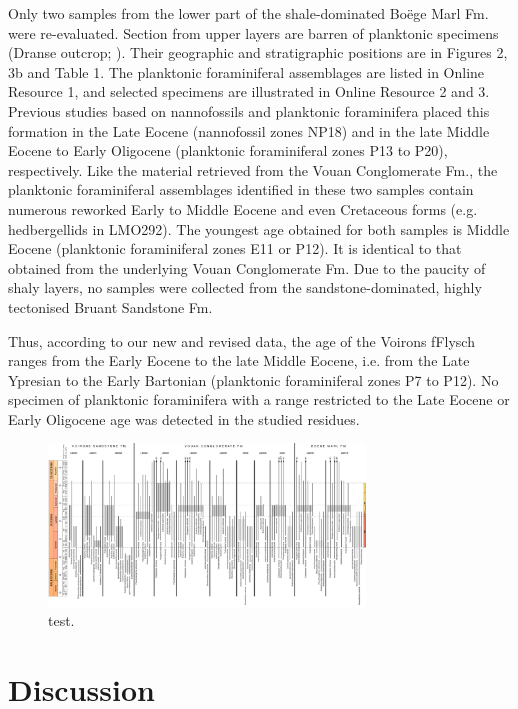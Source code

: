 \documentclass[twoside]{article}
\begin{document}
Only two samples from the lower part of the shale-dominated Boëge Marl Fm. were re-evaluated. Section from upper layers are barren of planktonic specimens (Dranse outcrop; \citealp{JanduChene1975c}). Their geographic and stratigraphic positions are  in Figures 2, 3b and Table 1. The planktonic foraminiferal assemblages are listed in Online Resource 1, and selected specimens are illustrated in Online Resource 2 and 3. Previous studies based on nannofossils \citep{Stuijvenberg1980a} and planktonic foraminifera \citep{Coppo1999,Ospina-Ostios2013,Ospina-Ostios2017} placed this formation in the Late Eocene (nannofossil zones NP18) and in the late Middle Eocene to Early Oligocene (planktonic foraminiferal zones P13 to P20), respectively. Like the material retrieved from the Vouan Conglomerate Fm., the planktonic foraminiferal assemblages identified in these two samples contain numerous reworked Early to Middle Eocene and even Cretaceous forms (e.g. hedbergellids in LMO292). The youngest age obtained for both samples is Middle Eocene (planktonic foraminiferal zones E11 or P12). It is identical to that obtained from the underlying Vouan Conglomerate Fm. Due to the paucity of shaly layers, no samples were collected from the sandstone-dominated, highly tectonised Bruant Sandstone Fm.\par
Thus, according to our new and revised data, the age of the Voirons fFlysch ranges from the Early Eocene to the late Middle Eocene, i.e. from the Late Ypresian to the Early Bartonian (planktonic foraminiferal zones P7 to P12). No specimen of planktonic foraminifera with a range restricted to the Late Eocene or Early Oligocene age was detected in the studied residues.\par

	\begin{figure}[htp!]
		\centering
		\includegraphics[angle=270,width=0.75\textwidth]{Fig5.pdf}
		\caption{test.}
		\label{fig:Fig5}
	\end{figure}

\section{Discussion}
\end{document}
